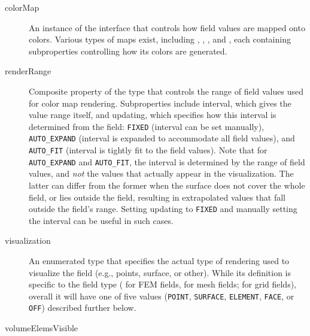 \begin{description}

\item[colorMap]\mbox{}

An instance of the  interface
that controls how field values are mapped onto colors.
Various types of maps exist, including 
,
,
, and
,
each containing subproperties controlling how its colors are generated.

\item[renderRange]\mbox{}

Composite property of the type
 that controls the range
of field values used for color map rendering. Subproperties include
{\sf interval}, which gives the value range itself, and {\sf
updating}, which specifies how this interval is determined from the
field: {\tt FIXED} (interval can be set manually), {\tt AUTO\_EXPAND}
(interval is expanded to accommodate all field values), and {\tt
AUTO\_FIT} (interval is tightly fit to the field values).  Note that
for {\tt AUTO\_EXPAND} and {\tt AUTO\_FIT}, the interval is determined
by the range of field values, and {\it not} the values that actually
appear in the visualization. The latter can differ from the former
when the surface does not cover the whole field, or lies outside the
field, resulting in extrapolated values that fall outside the field's
range. Setting {\sf updating} to {\tt FIXED} and manually setting the
interval can be useful in such cases.

\item[visualization]\mbox{}

An enumerated type that specifies the actual type of rendering used to
visualize the field (e.g., points, surface, or other). While its
definition is specific to the field type
( for
FEM fields,
 for
mesh fields;
 for
grid fields), overall it will have one of five values ({\tt POINT},
{\tt SURFACE}, {\tt ELEMENT}, {\tt FACE}, or {\tt OFF})
described further below.

\item[volumeElemsVisible]\mbox{}


\end{description}
